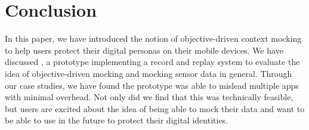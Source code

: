 \section{Conclusion}
\label{sec-conclusion}

In this paper, we have introduced the notion of objective-driven context
mocking to help users protect their digital personas on their mobile devices.
We have discussed \PocketMocker{}, a prototype implementing a record and
replay system to evaluate the idea of objective-driven mocking and mocking
sensor data in general. Through our case studies, we have found the prototype
was able to mislead multiple apps with minimal overhead. Not only did
we find that this was technically feasible, but users are excited about the
idea of being able to mock their data and want to be able to use
\PocketMocker{} in the future to protect their digital identities.
